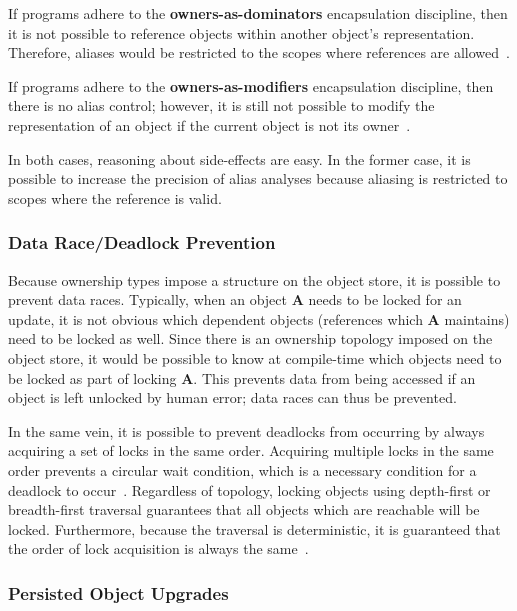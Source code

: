 \documentclass{acm_proc_article-sp}
\begin{document}
If programs adhere to the \textbf{owners-as-dominators} encapsulation
discipline, then it is not possible to reference objects within another
object's representation. Therefore, aliases would be restricted to
the scopes where references are
allowed~\cite{clarke98ownership,boyapati04safejava,cameron07mojo}.

If programs adhere to the \textbf{owners-as-modifiers} encapsulation
discipline, then there is no alias control; however, it is still not possible
to modify the representation of an object if the current object is not its
owner~\cite{cunningham08ut,dietl09gut}.

In both cases, reasoning about side-effects are easy. In the former case, it is
possible to increase the precision of alias analyses because aliasing is
restricted to scopes where the reference is valid.

\subsubsection{Data Race/Deadlock Prevention}
\label{subsubsec:data_race_prevention}

Because ownership types impose a structure on the object store, it is possible
to prevent data races. Typically, when an object \textbf{A} needs to be locked
for an update, it is not obvious which dependent objects (references which
\textbf{A} maintains) need to be locked as well. Since there is an ownership
topology imposed on the object store, it would be possible to know at
compile-time which objects need to be locked as part of locking \textbf{A}.
This prevents data from being accessed if an object is left unlocked by human
error; data races can thus be prevented.

In the same vein, it is possible to prevent deadlocks from occurring by always
acquiring a set of locks in the same order. Acquiring multiple locks in the same
order prevents a circular wait condition, which is a necessary condition for a
deadlock to occur~\cite{silberschatz08os}. Regardless of topology,
locking objects using depth-first or breadth-first traversal guarantees that
all objects which are reachable will be locked. Furthermore, because the
traversal is deterministic, it is guaranteed that the order of lock acquisition
is always the same~\cite{boyapati02races}.

\subsubsection{Persisted Object Upgrades}
\label{subsubsec:object_upgrades}
\end{document}
